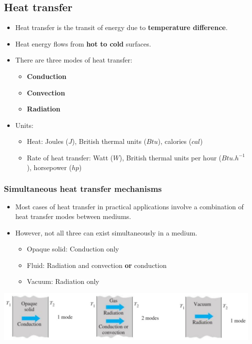 \documentclass[11pt]{article}
\begin{document}
\subsection{Heat transfer}
\label{sec:org36229d0}
\begin{itemize}
\item Heat transfer is the transit of energy due to \textbf{temperature difference}.
\item Heat energy flows from \textbf{hot to cold} surfaces.
\item There are three modes of heat transfer:
\begin{itemize}
\item \textbf{Conduction}
\item \textbf{Convection}
\item \textbf{Radiation}
\end{itemize}
\item Units:
\begin{itemize}
\item Heat: Joules (\(\unit{J}\)), British thermal units (\(\unit{Btu}\)), calories (\(\unit{cal}\))
\item Rate of heat transfer: Watt (\(\unit{W}\)), British thermal units per hour (\(\unit{Btu.h^{-1}}\)), horsepower (\(\unit{hp}\))
\end{itemize}
\end{itemize}

\subsubsection{Simultaneous heat transfer mechanisms}
\label{sec:org9757d0f}
\begin{itemize}
\item Most cases of heat transfer in practical applications involve a combination of heat transfer modes between mediums.
\item However, not all three can exist simultaneously in a medium.
\begin{itemize}
\item Opaque solid: Conduction only
\item Fluid: Radiation and convection \textbf{or} conduction
\item Vacuum: Radiation only
\end{itemize}
\end{itemize}

\begin{center}
\includegraphics[width=.9\linewidth]{./images/simultaneous-heat-transfer-mechanisms.png}
\end{center}
\end{document}
